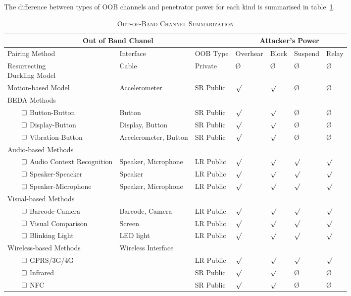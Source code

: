 The difference between types of OOB channels and penetrator power for each kind is summarised in table~\ref{channelsum}. 

\begin{table}[ht] \center
\caption{\textsc{Out-of-Band Channel Summarization}}
\label{channelsum}
{\scriptsize
\begin{tabular}{ p{3.5cm} p{3cm} l | l l l l }
\hline
\multicolumn{3}{c}{Out of Band Chanel} & \multicolumn{4}{c}{Attacker's Power} \\
\hline
\hline
Pairing Method & Interface & OOB Type & Overhear &Block & Suspend & Relay  \\
\hline\hline
 \parbox[t]{3cm}{Resurrecting \\ Duckling Model} & Cable & Private & \O & \O & \O& \O \\ \hline
Motion-based Model & Accelerometer & SR Public & $\surd$ & $\surd$  & \O& \O \\ \hline
BEDA Methods & & & & & &  \\ 
$\qed$ Button-Button & Button & SR Public & $\surd$ & $\surd$ & \O& \O  \\ 
$\qed$ Display-Button & Display, Button & SR Public & $\surd$ & $\surd$ &\O & \O  \\ 
$\qed$ Vibration-Button & Accelerometer, Button & SR Public & $\surd$ & $\surd$ & \O & \O  \\ 
\hline 
Audio-based Methods & & & & & &  \\
$\qed$ Audio Context Recognition & Speaker, Microphone & LR Public & $\surd$ & $\surd$ & $\surd$& $\surd$  \\ 
$\qed$ Speaker-Speacker & Speaker & LR Public & $\surd$ & $\surd$ & $\surd$& $\surd$  \\ 
$\qed$ Speaker-Microphone & Speaker, Microphone & LR Public & $\surd$ & $\surd$ & $\surd$ & $\surd$  \\ \hline

Visual-based Methods & & & & & &  \\
$\qed$ Barcode-Camera& Barcode, Camera & LR Public & $\surd$ &$\surd$ &$\surd$ & $\surd$   \\ 
$\qed$ Visual Comparison & Screen & LR Public & $\surd$ & $\surd$ &$\surd$ &$\surd$   \\
$\qed$ Blinking Light & LED light & LR Public & $\surd$ & $\surd$ &$\surd$ &$\surd$   \\ \hline

Wireless-based Methods & Wireless Interface & & & & &  \\ 
$\qed$ GPRS/3G/4G & & LR Public & $\surd$ &$\surd$ & $\surd$ & $\surd$  \\
$\qed$ Infrared & & SR Public & $\surd$ & $\surd$ & \O & \O \\ 
$\qed$ NFC & & SR Public & $\surd$ & $\surd$ & \O& \O \\ \hline
\end{tabular}
}
\end{table}

